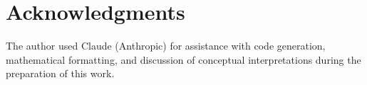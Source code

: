 \documentclass[11pt,a4paper]{article}
\theoremstyle{plain}
\theoremstyle{definition}
\theoremstyle{remark}
\begin{document}
\section*{Acknowledgments}
The author used Claude (Anthropic) for assistance with code generation,
mathematical formatting, and discussion of conceptual interpretations during
the preparation of this work.



\end{document}
